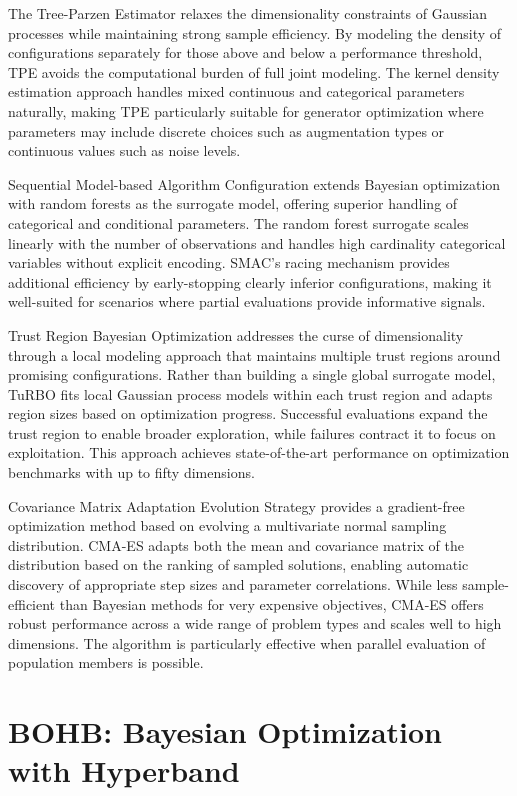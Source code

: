The Tree-Parzen Estimator relaxes the dimensionality constraints of Gaussian processes while maintaining strong sample efficiency. By modeling the density of configurations separately for those above and below a performance threshold, TPE avoids the computational burden of full joint modeling. The kernel density estimation approach handles mixed continuous and categorical parameters naturally, making TPE particularly suitable for generator optimization where parameters may include discrete choices such as augmentation types or continuous values such as noise levels.

Sequential Model-based Algorithm Configuration extends Bayesian optimization with random forests as the surrogate model, offering superior handling of categorical and conditional parameters. The random forest surrogate scales linearly with the number of observations and handles high cardinality categorical variables without explicit encoding. SMAC's racing mechanism provides additional efficiency by early-stopping clearly inferior configurations, making it well-suited for scenarios where partial evaluations provide informative signals.

Trust Region Bayesian Optimization addresses the curse of dimensionality through a local modeling approach that maintains multiple trust regions around promising configurations. Rather than building a single global surrogate model, TuRBO fits local Gaussian process models within each trust region and adapts region sizes based on optimization progress. Successful evaluations expand the trust region to enable broader exploration, while failures contract it to focus on exploitation. This approach achieves state-of-the-art performance on optimization benchmarks with up to fifty dimensions.

Covariance Matrix Adaptation Evolution Strategy provides a gradient-free optimization method based on evolving a multivariate normal sampling distribution. CMA-ES adapts both the mean and covariance matrix of the distribution based on the ranking of sampled solutions, enabling automatic discovery of appropriate step sizes and parameter correlations. While less sample-efficient than Bayesian methods for very expensive objectives, CMA-ES offers robust performance across a wide range of problem types and scales well to high dimensions. The algorithm is particularly effective when parallel evaluation of population members is possible.


\section{BOHB: Bayesian Optimization with Hyperband}
\label{sec:bohb}

